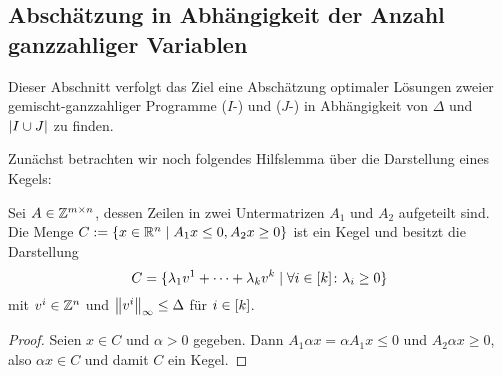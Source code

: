 \subsection{Abschätzung in Abhängigkeit der Anzahl ganzzahliger Variablen}
Dieser Abschnitt verfolgt das Ziel eine Abschätzung optimaler Lösungen zweier gemischt-ganzzahliger Programme	($I$-\MIP) und ($J$-\MIP) in Abhängigkeit von $\Delta$ und $\lvert I\cup J \rvert$ zu finden.

Zunächst betrachten wir noch folgendes Hilfslemma über die Darstellung eines Kegels:
\begin{lemma}\label{lem:cone}
	Sei $A\in\mathbb{Z}^{m\times n}$, dessen Zeilen in zwei Untermatrizen $A_1$ und $A_2$ aufgeteilt sind.
	Die Menge $C:=\{ x\in\mathbb{R}^n \mid A_1x\leq 0, A_2x\geq0 \}$ ist ein Kegel und besitzt die Darstellung \[ C=\{\lambda_1 v^1+\dots+\lambda_kv^k \mid \forall i\in[k] \colon\lambda_i\geq0 \}\] mit $v^i\in\mathbb{Z}^n$ und $\left\lVert v^i\right\rVert_\infty\leq\Delta$ für $i\in[k]$.
\end{lemma}
\begin{proof}
	Seien $x\in C$ und $\alpha>0$ gegeben.
	Dann $A_1 \alpha x=\alpha A_1 x\leq 0$ und $A_2\alpha x\geq0$, also $\alpha x\in C$ und damit $C$ ein Kegel.
	
\end{proof}

